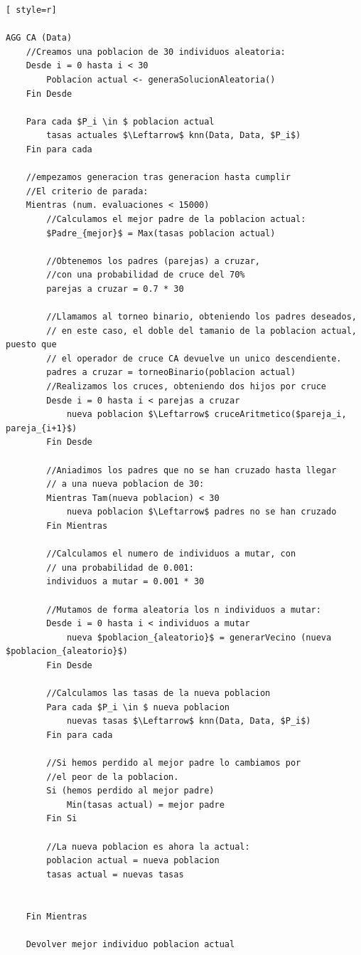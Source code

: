 \begin{lstlisting}[ style=r]

AGG CA (Data)
	//Creamos una poblacion de 30 individuos aleatoria:
	Desde i = 0 hasta i < 30
		Poblacion actual <- generaSolucionAleatoria()
	Fin Desde
	
	Para cada $P_i \in $ poblacion actual
		tasas actuales $\Leftarrow$ knn(Data, Data, $P_i$)
	Fin para cada
	
	//empezamos generacion tras generacion hasta cumplir
	//El criterio de parada:
	Mientras (num. evaluaciones < 15000)
		//Calculamos el mejor padre de la poblacion actual:
		$Padre_{mejor}$ = Max(tasas poblacion actual)
		
		//Obtenemos los padres (parejas) a cruzar, 
		//con una probabilidad de cruce del 70%
		parejas a cruzar = 0.7 * 30
		
		//Llamamos al torneo binario, obteniendo los padres deseados, 
		// en este caso, el doble del tamanio de la poblacion actual, puesto que 
		// el operador de cruce CA devuelve un unico descendiente.
		padres a cruzar = torneoBinario(poblacion actual)
		//Realizamos los cruces, obteniendo dos hijos por cruce
		Desde i = 0 hasta i < parejas a cruzar
			nueva poblacion $\Leftarrow$ cruceAritmetico($pareja_i, pareja_{i+1}$)
		Fin Desde
		
		//Aniadimos los padres que no se han cruzado hasta llegar 
		// a una nueva poblacion de 30:
		Mientras Tam(nueva poblacion) < 30
			nueva poblacion $\Leftarrow$ padres no se han cruzado
		Fin Mientras
		
		//Calculamos el numero de individuos a mutar, con
		// una probabilidad de 0.001:
		individuos a mutar = 0.001 * 30
		
		//Mutamos de forma aleatoria los n individuos a mutar:
		Desde i = 0 hasta i < individuos a mutar
			nueva $poblacion_{aleatorio}$ = generarVecino (nueva $poblacion_{aleatorio}$)
		Fin Desde
		
		//Calculamos las tasas de la nueva poblacion
		Para cada $P_i \in $ nueva poblacion
			nuevas tasas $\Leftarrow$ knn(Data, Data, $P_i$)
		Fin para cada
		
		//Si hemos perdido al mejor padre lo cambiamos por 
		//el peor de la poblacion.
		Si (hemos perdido al mejor padre)
			Min(tasas actual) = mejor padre
		Fin Si
		
		//La nueva poblacion es ahora la actual:
		poblacion actual = nueva poblacion
		tasas actual = nuevas tasas
		
	
	Fin Mientras
	
	Devolver mejor individuo poblacion actual
\end{lstlisting}


